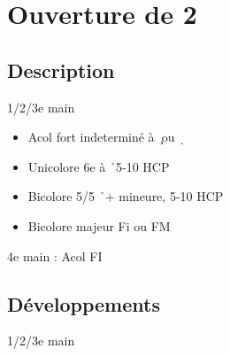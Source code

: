 \documentclass[a4paper]{article}
\begin{document}
\section{Ouverture de 2\pdfd}

\subsection{Description}

1/2/3e main

\begin{itemize}
\item Acol fort indeterminé à \c\ ou \d\ 

\item Unicolore 6e à \h\ 5-10 HCP 

\item Bicolore 5/5 \h\ + mineure, 5-10 HCP

\item Bicolore majeur Fi ou FM

\end{itemize}

\begin{bidtable}
4e \> main : Acol FI
\end{bidtable}

\subsection{Développements}

1/2/3e main
\end{document}
